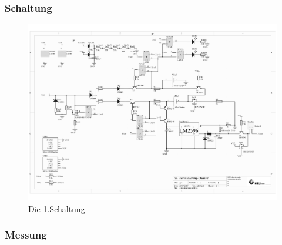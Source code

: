 \documentclass[12pt,a4paper]{article}
\begin{document}
{\subsubsection{Schaltung}
\label{SUBSUBSEC:CIRCUIT-1}
\begin{figure}[H]
  \centering
		\includegraphics[scale=0.7, angle=90]{graphics/20170920-Shematic.pdf}
		\caption{Die 1.Schaltung}
		\label{fig:circuit1}
\end{figure}

\newpage
\subsubsection{Messung}
\label{SUBSUBSEC:MEASUREMENT1}

}
\end{document}
